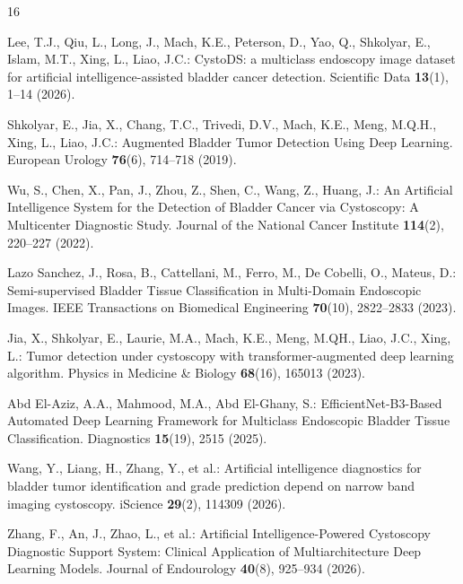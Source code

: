 \documentclass[runningheads]{llncs}
\begin{document}
%
%
\begin{thebibliography}{16}

Lee, T.J., Qiu, L., Long, J., Mach, K.E., Peterson, D., Yao, Q., Shkolyar, E., Islam, M.T., Xing, L., Liao, J.C.: CystoDS: a multiclass endoscopy image dataset for artificial intelligence-assisted bladder cancer detection. Scientific Data \textbf{13}(1), 1--14 (2026). 

Shkolyar, E., Jia, X., Chang, T.C., Trivedi, D.V., Mach, K.E., Meng, M.Q.H., Xing, L., Liao, J.C.: Augmented Bladder Tumor Detection Using Deep Learning. European Urology \textbf{76}(6), 714--718 (2019). 

Wu, S., Chen, X., Pan, J., Zhou, Z., Shen, C., Wang, Z., Huang, J.: An Artificial Intelligence System for the Detection of Bladder Cancer via Cystoscopy: A Multicenter Diagnostic Study. Journal of the National Cancer Institute \textbf{114}(2), 220--227 (2022). 

Lazo Sanchez, J., Rosa, B., Cattellani, M., Ferro, M., De Cobelli, O., Mateus, D.: Semi-supervised Bladder Tissue Classification in Multi-Domain Endoscopic Images. IEEE Transactions on Biomedical Engineering \textbf{70}(10), 2822--2833 (2023). 

Jia, X., Shkolyar, E., Laurie, M.A., Mach, K.E., Meng, M.QH., Liao, J.C., Xing, L.: Tumor detection under cystoscopy with transformer-augmented deep learning algorithm. Physics in Medicine \& Biology \textbf{68}(16), 165013 (2023). 

Abd El-Aziz, A.A., Mahmood, M.A., Abd El-Ghany, S.: EfficientNet-B3-Based Automated Deep Learning Framework for Multiclass Endoscopic Bladder Tissue Classification. Diagnostics \textbf{15}(19), 2515 (2025). 

Wang, Y., Liang, H., Zhang, Y., et al.: Artificial intelligence diagnostics for bladder tumor identification and grade prediction depend on narrow band imaging cystoscopy. iScience \textbf{29}(2), 114309 (2026). 

Zhang, F., An, J., Zhao, L., et al.: Artificial Intelligence-Powered Cystoscopy Diagnostic Support System: Clinical Application of Multiarchitecture Deep Learning Models. Journal of Endourology \textbf{40}(8), 925--934 (2026). 


\end{thebibliography}
\end{document}
